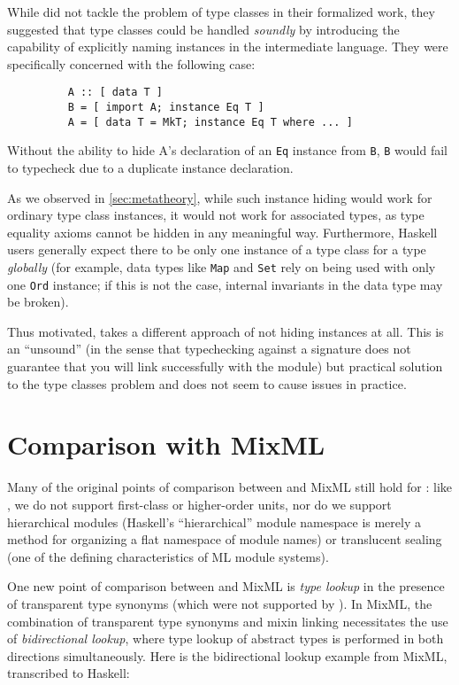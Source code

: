 While \OldBackpack{} did not tackle the problem of type classes in their
formalized work, they suggested that type classes could be handled
\emph{soundly} by introducing the capability of explicitly naming instances
in the intermediate language.  They were specifically concerned with the
following case:

\begin{figure}[H]
\begin{lstlisting}
    A :: [ data T ]
    B = [ import A; instance Eq T ]
    A = [ data T = MkT; instance Eq T where ... ]
\end{lstlisting}
\end{figure}

\noindent
Without the ability to hide A's declaration of an \verb|Eq| instance
from \verb|B|, \verb|B| would fail to typecheck due to a duplicate
instance declaration.

As we observed in \cref{sec:metatheory}, while such instance
hiding would work for ordinary type class instances, it would not work
for associated types, as type equality axioms cannot be hidden in any
meaningful way.  Furthermore, Haskell users generally expect there
to be only one instance of a type class for a type \emph{globally} (for
example, data types like \verb|Map| and \verb|Set| rely on being used
with only one \verb|Ord| instance; if this is not the case, internal
invariants in the data type may be broken).

Thus motivated, \Backpack{} takes a different approach of not hiding
instances at all.  This is an ``unsound'' (in the sense that typechecking
against a signature does not guarantee that you will link successfully
with the module) but practical solution to the type classes problem
and does not seem to cause issues in practice.

\section{Comparison with MixML}

Many of the original points of comparison between \OldBackpack{} and
MixML still hold for \Backpack{}: like \OldBackpack{}, we do not support
first-class or higher-order units, nor do we support hierarchical
modules (Haskell's ``hierarchical'' module namespace is merely a method
for organizing a flat namespace of module names) or translucent sealing
(one of the defining characteristics of ML module systems).

One new point of comparison between \Backpack{} and MixML is \emph{type lookup}
in the presence of transparent type synonyms (which were not supported
by \OldBackpack{}).  In MixML, the combination of transparent type
synonyms and mixin linking necessitates the use of \emph{bidirectional lookup}, where
type lookup of abstract types is performed in both directions simultaneously.
Here is the bidirectional lookup example from MixML, transcribed to Haskell:

